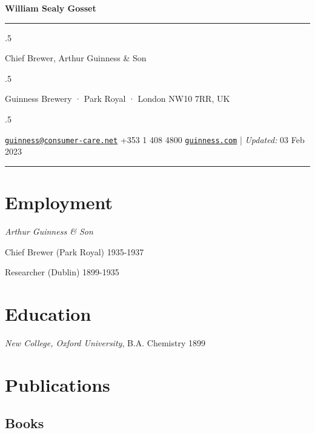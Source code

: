 \documentclass[11pt,]{article}
\begin{document}
\centerline{\huge \bf William Sealy Gosset}

\vspace{2 mm}

\hrule

\vspace{2 mm}

\moveleft.5\hoffset\centerline{Chief Brewer, Arthur Guinness \& Son}
\moveleft.5\hoffset\centerline{Guinness Brewery · Park Royal · London
NW10 7RR, UK}
\moveleft.5\hoffset\centerline{ \faEnvelopeO \hspace{1 mm} \href{mailto:}{\tt \href{mailto:guinness@consumer-care.net}{\nolinkurl{guinness@consumer-care.net}}} \hspace{1 mm}  \faPhone \hspace{1 mm}  +353
1 408
4800  \hspace{1 mm}       \faGlobe \hspace{1 mm} \href{http://guinness.com}{\tt guinness.com}    | \emph{Updated:} 03
Feb 2023}



\vspace{2 mm}

\hrule



\hypertarget{employment}{%
\section{Employment}\label{employment}}

\emph{Arthur Guinness \& Son}

Chief Brewer (Park Royal) \hfill 1935-1937

Researcher (Dublin) \hfill 1899-1935

\hypertarget{education}{%
\section{Education}\label{education}}

\emph{New College, Oxford University}, B.A. Chemistry \hfill 1899

\hypertarget{publications}{%
\section{Publications}\label{publications}}

\hypertarget{books}{%
\subsection{Books}\label{books}}
\end{document}
